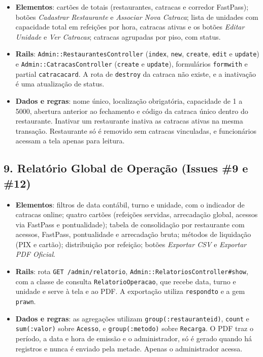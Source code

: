 \documentclass[a4paper,12pt]{article}
\renewcommand{\_}{\textunderscore\allowbreak}
\begin{document}
\begin{itemize}

    \item \textbf{Elementos}: cartões de totais (restaurantes, catracas e corredor FastPass); botões \textit{Cadastrar Restaurante} e \textit{Associar Nova Catraca}; lista de unidades com capacidade total em refeições por hora, catracas ativas e os botões \textit{Editar Unidade} e \textit{Ver Catracas}; catracas agrupadas por piso, com status.

    \item \textbf{Rails}: \texttt{Admin::\allowbreak{}RestaurantesController} (\texttt{index}, \texttt{new}, \texttt{create}, \texttt{edit} e \texttt{update}) e \texttt{Admin::\allowbreak{}CatracasController} (\texttt{create} e \texttt{update}), formulários \texttt{form\_with} e partial \texttt{\_catraca\_card}. A rota de \texttt{destroy} da catraca não existe, e a inativação é uma atualização de status.

    \item \textbf{Dados e regras}: nome único, localização obrigatória, capacidade de 1 a 5000, abertura anterior ao fechamento e código da catraca único dentro do restaurante. Inativar um restaurante inativa as catracas ativas na mesma transação. Restaurante só é removido sem catracas vinculadas, e funcionários acessam a tela apenas para leitura.

\end{itemize}

\subsection*{9. Relatório Global de Operação (Issues \#9 e \#12)}

\begin{itemize}

    \item \textbf{Elementos}: filtros de data contábil, turno e unidade, com o indicador de catracas online; quatro cartões (refeições servidas, arrecadação global, acessos via FastPass e pontualidade); tabela de consolidação por restaurante com acessos, FastPass, pontualidade e arrecadação bruta; métodos de liquidação (PIX e cartão); distribuição por refeição; botões \textit{Exportar CSV} e \textit{Exportar PDF Oficial}.

    \item \textbf{Rails}: rota \texttt{GET /admin/\allowbreak{}relatorio}, \texttt{Admin::\allowbreak{}RelatoriosController\#\allowbreak{}show}, com a classe de consulta \texttt{RelatorioOperacao}, que recebe data, turno e unidade e serve à tela e ao PDF. A exportação utiliza \texttt{respond\_to} e a gem \texttt{prawn}.

    \item \textbf{Dados e regras}: as agregações utilizam \texttt{group(:restaurante\_id)}, \texttt{count} e \texttt{sum(:valor)} sobre \texttt{Acesso}, e \texttt{group(:metodo)} sobre \texttt{Recarga}. O PDF traz o período, a data e hora de emissão e o administrador, só é gerado quando há registros e nunca é enviado pela metade. Apenas o administrador acessa.

\end{itemize}
\end{document}

